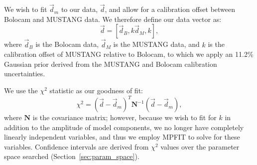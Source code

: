 \documentclass[iop,numberedappendix,apj]{emulateapj}
\begin{document}
We wish to fit $\vec{d}_m$ to our data, $\vec{d}$, and allow for a calibration offset between Bolocam and
MUSTANG data. We therefore define our data vector as:
\begin{equation}
  \vec{d} = [ \vec{d}_{B}, k \vec{d}_{M}, k ] ,
  \label{eqn:data_arr}
\end{equation}
where $\vec{d}_{B}$ is the Bolocam data, $\vec{d}_{M}$ is the MUSTANG data, and $k$ is the calibration offset of
MUSTANG relative to Bolocam, to which we apply an 11.2\% Gaussian prior derived from the MUSTANG and Bolocam
calibration uncertainties.

We use the $\chi^2$ statistic as our goodness of fit:
\begin{equation}
  \chi^2 = (\overrightarrow{d} - \overrightarrow{d}_m)^T \mathbf{N}^{-1} (\overrightarrow{d} - \overrightarrow{d}_m),
  \label{eqn:chi_sq}
\end{equation}
where $\mathbf{N}$ is the covariance matrix; however, because we wish to fit for $k$ in addition to the 
amplitude of model components, we no longer have completely linearly independent variables, and thus we 
employ MPFIT \citep{markwardt2009} to solve for these variables. Confidence intervals are derived from 
$\chi^2$ values over the parameter space searched (Section~\ref{sec:param_space}).



\end{document}
